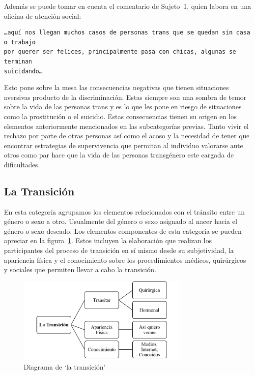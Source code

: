 Además se puede tomar en cuenta el comentario de Sujeto~1, quien labora en una oficina de atención social:

\begin{verbatim}
…aquí nos llegan muchos casos de personas trans que se quedan sin casa o trabajo
por querer ser felices, principalmente pasa con chicas, algunas se terminan
suicidando…
\end{verbatim}

 Esto pone sobre la mesa las consecuencias negativas que tienen situaciones
 aversivas producto de la discriminación. Estas siempre son una sombra de temor
 sobre la vida de las personas trans y es lo que les pone en riesgo de
 situaciones como la prostitución o el suicidio. Estas consecuencias tienen su
 origen en los elementos anteriormente mencionados en las subcategorías previas.
 Tanto vivir el rechazo por parte de otras personas así como el acoso y la
 necesidad de tener que encontrar estrategias de supervivencia que permitan al
 individuo valorarse ante otros como par hace que la vida de las personas
 transgénero este cargada de dificultades.

\subsection{La Transición}

En esta categoría agrupamos los elementos relacionados con el tránsito entre un
género o sexo a otro. Usualmente del género o sexo asignado al nacer hacia el
género o sexo deseado. Los elementos componentes de esta categoría se pueden
apreciar en la figura~\ref{fig:transicion}. Estos incluyen la elaboración que
realizan los participantes del proceso de transición en sí mismo desde su
subjetividad, la apariencia física y el conocimiento sobre los procedimientos
médicos, quirúrgicos y sociales que permiten llevar a cabo la transición.

\begin{figure}
    \centering
    \includegraphics[width=0.75\textwidth]{transicion}
    \caption{Diagrama de ‘la transición’}\label{fig:transicion}
\end{figure}

